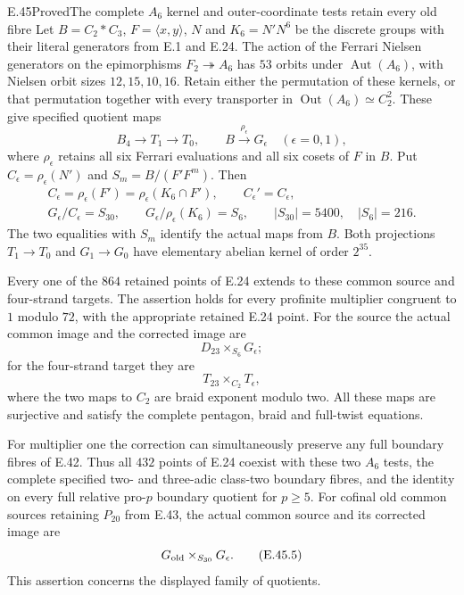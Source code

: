 \begin{statement}{E.45}{Proved}{The complete $A_6$ kernel and outer-coordinate tests retain every old fibre}
Let $B=C_2*C_3$, $F=\langle x,y\rangle$, $N$ and $K_6=N'N^6$
be the discrete groups with their literal generators from E.1 and E.24.
The action of the Ferrari Nielsen generators on the epimorphisms
$F_2\twoheadrightarrow A_6$ has $53$ orbits under
$\operatorname{Aut}(A_6)$, with Nielsen orbit sizes
$12,15,10,16$.  Retain either the permutation of these kernels,
or that permutation together with every transporter in
$\operatorname{Out}(A_6)\simeq C_2^2$.
These give specified quotient maps
\[
 B_4\longrightarrow T_1\longrightarrow T_0,
 \qquad B\xrightarrow{\rho_\epsilon}G_\epsilon
 \quad(\epsilon=0,1),
 \tag{E.45.1}
\]
where $\rho_\epsilon$ retains all six Ferrari evaluations and
all six cosets of $F$ in $B$.
Put $C_\epsilon=\rho_\epsilon(N')$ and
$S_m=B/(F'F^m)$.  Then
\[
 \begin{gathered}
 C_\epsilon=\rho_\epsilon(F')
            =\rho_\epsilon(K_6\cap F'),
 \qquad C_\epsilon'=C_\epsilon,\\
 G_\epsilon/C_\epsilon=S_{30},\qquad
 G_\epsilon/\rho_\epsilon(K_6)=S_6,
 \qquad |S_{30}|=5400,\quad |S_6|=216.
 \end{gathered}
 \tag{E.45.2}
\]
The two equalities with $S_m$ identify the actual maps from $B$.
Both projections $T_1\to T_0$ and $G_1\to G_0$ have
elementary abelian kernel of order $2^{35}$.

Every one of the $864$ retained points of E.24 extends to these
common source and four-strand targets.  The assertion holds for
every profinite multiplier congruent to $1$ modulo $72$, with
the appropriate retained E.24 point.  For the source the actual
common image and the corrected image are
\[
                 D_{23}\times_{S_6}G_\epsilon;
 \tag{E.45.3}
\]
for the four-strand target they are
\[
                 T_{23}\times_{C_2}T_\epsilon,
 \tag{E.45.4}
\]
where the two maps to $C_2$ are braid exponent modulo two.
All these maps are surjective and satisfy the complete pentagon,
braid and full-twist equations.

For multiplier one the correction can simultaneously preserve
any full boundary fibres of E.42.  Thus all $432$ points of E.24
coexist with these two $A_6$ tests, the complete specified
two- and three-adic class-two boundary fibres, and the identity
on every full relative pro-$p$ boundary quotient for $p\ge5$.
For cofinal old common sources retaining $P_{20}$ from E.43,
the actual common source and its corrected image are
\[
                 G_{\rm old}\times_{S_{30}}G_\epsilon.
 \tag{E.45.5}
\]
This assertion concerns the displayed family of quotients.
\end{statement}
